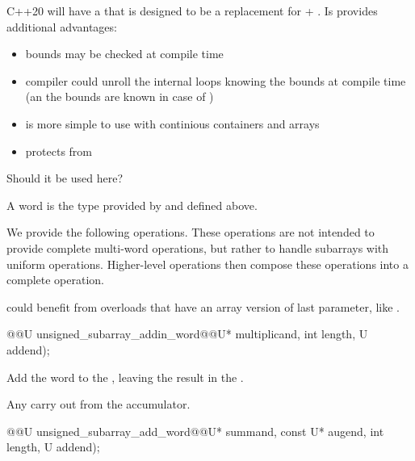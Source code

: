 \begin{addedblock}
\begin{modifcommentblock}
C++20 will have a  that is designed to be a replacement for  + . Is provides additional advantages:
\begin{itemize}
  \item bounds may be checked at compile time
  \item compiler could unroll the internal loops knowing the bounds at compile time (an the bounds are known in case of )
  \item {} is more simple to use with continious containers and arrays
  \item {} protects from 
\end{itemize}
Should it be used here?
\end{modifcommentblock}

A word is the type provided by  and defined above.

We provide the following operations. These operations are not intended to provide complete multi-word operations, but rather to handle subarrays with uniform operations. Higher-level operations then compose these operations into a complete operation.

\begin{modifcommentblock}
 could benefit from overloads that have an array version of last parameter, like .
\end{modifcommentblock}

\begin{itemdecl}
@@U unsigned_subarray_addin_word@\tcode{\addmodif{(}}@U* multiplicand, int length, U addend);
\end{itemdecl}

\begin{itemdescr}

\effects Add the word  to the , leaving the result in the .

\returns Any carry out from the accumulator.
\end{itemdescr}

\begin{itemdecl}
@@U unsigned_subarray_add_word@\tcode{\addmodif{(}}@U* summand, const U* augend, int length, U addend);    
\end{itemdecl}


\end{addedblock}
